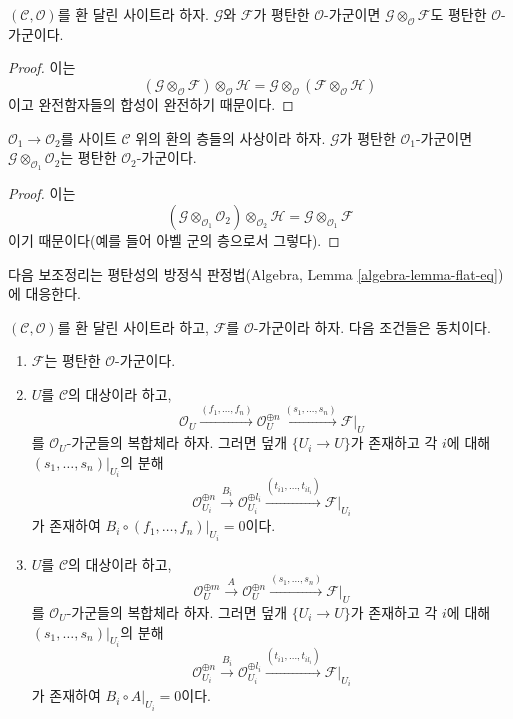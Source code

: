 \begin{lemma}
\label{lemma-tensor-flats}
$(\mathcal{C}, \mathcal{O})$를 환 달린 사이트라 하자. $\mathcal{G}$와
$\mathcal{F}$가 평탄한 $\mathcal{O}$-가군이면
$\mathcal{G} \otimes_\mathcal{O} \mathcal{F}$도 평탄한
$\mathcal{O}$-가군이다.
\end{lemma}

\begin{proof}
이는
$$
(\mathcal{G} \otimes_\mathcal{O} \mathcal{F}) \otimes_\mathcal{O} \mathcal{H}
=
\mathcal{G} \otimes_\mathcal{O} (\mathcal{F} \otimes_\mathcal{O} \mathcal{H})
$$
이고 완전함자들의 합성이 완전하기 때문이다.
\end{proof}

\begin{lemma}
\label{lemma-flat-change-of-rings}
$\mathcal{O}_1 \to \mathcal{O}_2$를 사이트 $\mathcal{C}$ 위의 환의 층들의
사상이라 하자. $\mathcal{G}$가 평탄한 $\mathcal{O}_1$-가군이면
$\mathcal{G} \otimes_{\mathcal{O}_1} \mathcal{O}_2$는 평탄한
$\mathcal{O}_2$-가군이다.
\end{lemma}

\begin{proof}
이는
$$
(\mathcal{G} \otimes_{\mathcal{O}_1} \mathcal{O}_2)
\otimes_{\mathcal{O}_2} \mathcal{H}
=
\mathcal{G} \otimes_{\mathcal{O}_1} \mathcal{F}
$$
이기 때문이다(예를 들어 아벨 군의 층으로서 그렇다).
\end{proof}

\noindent
다음 보조정리는 평탄성의 방정식 판정법(Algebra, Lemma
\ref{algebra-lemma-flat-eq})에 대응한다.

\begin{lemma}
\label{lemma-flat-eq}
$(\mathcal{C}, \mathcal{O})$를 환 달린 사이트라 하고, $\mathcal{F}$를
$\mathcal{O}$-가군이라 하자. 다음 조건들은 동치이다.
\begin{enumerate}
\item $\mathcal{F}$는 평탄한 $\mathcal{O}$-가군이다.
\item $U$를 $\mathcal{C}$의 대상이라 하고,
$$
\mathcal{O}_U \xrightarrow{(f_1, \ldots, f_n)}
\mathcal{O}_U^{\oplus n} \xrightarrow{(s_1, \ldots, s_n)}
\mathcal{F}|_U
$$
를 $\mathcal{O}_U$-가군들의 복합체라 하자. 그러면 덮개
$\{U_i \to U\}$가 존재하고 각 $i$에 대해 $(s_1, \ldots, s_n)|_{U_i}$의
분해
$$
\mathcal{O}_{U_i}^{\oplus n}
\xrightarrow{B_i}
\mathcal{O}_{U_i}^{\oplus l_i} \xrightarrow{(t_{i1}, \ldots, t_{il_i})}
\mathcal{F}|_{U_i}
$$
가 존재하여 $B_i \circ (f_1, \ldots, f_n)|_{U_i} = 0$이다.
\item $U$를 $\mathcal{C}$의 대상이라 하고,
$$
\mathcal{O}_U^{\oplus m} \xrightarrow{A}
\mathcal{O}_U^{\oplus n} \xrightarrow{(s_1, \ldots, s_n)}
\mathcal{F}|_U
$$
를 $\mathcal{O}_U$-가군들의 복합체라 하자. 그러면 덮개
$\{U_i \to U\}$가 존재하고 각 $i$에 대해 $(s_1, \ldots, s_n)|_{U_i}$의
분해
$$
\mathcal{O}_{U_i}^{\oplus n}
\xrightarrow{B_i}
\mathcal{O}_{U_i}^{\oplus l_i} \xrightarrow{(t_{i1}, \ldots, t_{il_i})}
\mathcal{F}|_{U_i}
$$
가 존재하여 $B_i \circ A|_{U_i} = 0$이다.
\end{enumerate}
\end{lemma}

